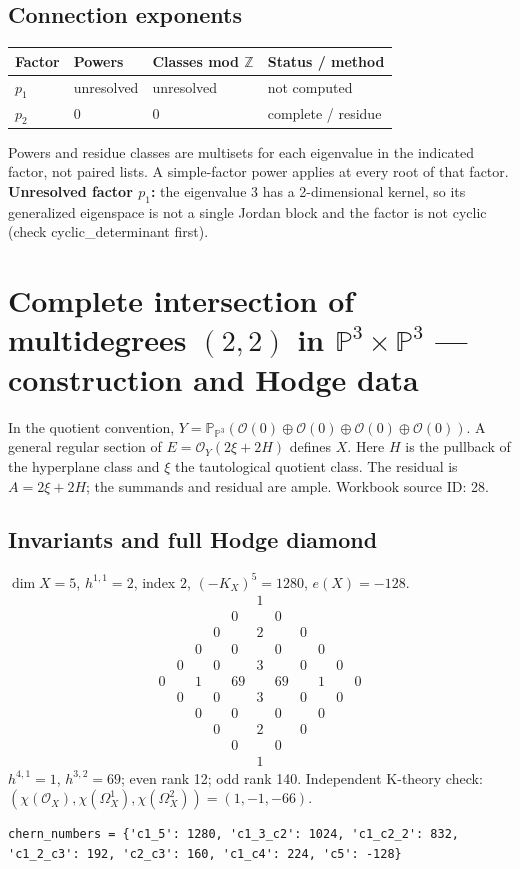 \documentclass[10pt,a4paper]{article}
\begin{document}
\subsection*{Connection exponents}
\begin{center}\begin{tabular}{llll}\toprule Factor & Powers & Classes mod $\mathbb Z$ & Status / method\\\midrule
$p_{1}$ & unresolved & unresolved & not computed\\
$p_{2}$ & $0$ & $0$ & complete / residue\\
\bottomrule\end{tabular}\end{center}
Powers and residue classes are multisets for each eigenvalue in the indicated factor, not paired lists. A simple-factor power applies at every root of that factor.
\textbf{Unresolved factor $p_{1}$:} the eigenvalue 3 has a 2-dimensional kernel, so its generalized eigenspace is not a single Jordan block and the factor is not cyclic (check cyclic\_determinant first).
\clearpage\section*{Complete intersection of multidegrees $(2,2)$ in $\mathbb P^{3}\times \mathbb P^{3}$ --- construction and Hodge data}\label{entry:PB5-028}
In the quotient convention, $Y=\mathbb P_{\mathbb P^{3}}(\mathcal O(0)\oplus\mathcal O(0)\oplus\mathcal O(0)\oplus\mathcal O(0))$.
A general regular section of $E=\mathcal O_Y(2\xi+2H)$ defines $X$.
Here $H$ is the pullback of the hyperplane class and $\xi$ the tautological quotient class. The residual is $A=2\xi+2H$; the summands and residual are ample.
Workbook source ID: 28.
\subsection*{Invariants and full Hodge diamond}
$\dim X=5$, $h^{1,1}=2$, index $2$, $(-K_X)^5=1280$, $e(X)=-128$.
\[\begin{array}{ccccccccccc}&&&&&1&&&&&\\&&&&0&&0&&&&\\&&&0&&2&&0&&&\\&&0&&0&&0&&0&&\\&0&&0&&3&&0&&0&\\0&&1&&69&&69&&1&&0\\&0&&0&&3&&0&&0&\\&&0&&0&&0&&0&&\\&&&0&&2&&0&&&\\&&&&0&&0&&&&\\&&&&&1&&&&&\end{array}\]
$h^{4,1}=1$, $h^{3,2}=69$; even rank 12; odd rank 140.
Independent K-theory check: $(\chi(\mathcal O_X),\chi(\Omega_X^1),\chi(\Omega_X^2))=(1, -1, -66)$.
\begin{lstlisting}
chern_numbers = {'c1_5': 1280, 'c1_3_c2': 1024, 'c1_c2_2': 832, 'c1_2_c3': 192, 'c2_c3': 160, 'c1_c4': 224, 'c5': -128}
\end{lstlisting}
\end{document}

